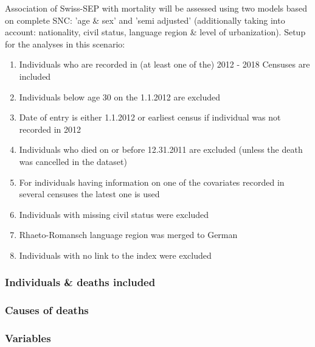 \documentclass[a4paper, notitlepage, fleqn]{article} %
\begin{document}
Association of Swiss-SEP with mortality will be assessed using two models based on complete SNC: 
'age \& sex' and 'semi adjusted'  
(additionally taking into account: nationality, civil status, language region \& level of urbanization). Setup for the analyses in this scenario: 
\begin{enumerate}

	\item Individuals who are recorded in (at least one of the) 2012 - 2018 Censuses are included
	\item Individuals below age 30 on the 1.1.2012 are excluded
	\item Date of entry is either 1.1.2012 or earliest census if individual was not recorded in 2012
	\item Individuals who died on or before 12.31.2011 are excluded (unless the death was cancelled in the dataset)
	\item For individuals having information on one of the covariates recorded in several censuses the latest one is used
	\item Individuals with missing civil status were excluded
	\item Rhaeto-Romansch language region was merged to German
	\item Individuals with no link to the index were excluded
	
\end{enumerate}

\subsubsection{Individuals \& deaths included}
\begin{stlog}\end{stlog}
\subsubsection{Causes of deaths}
\begin{stlog}\end{stlog}
\subsubsection{Variables}
\begin{stlog}\end{stlog}
\end{document}
